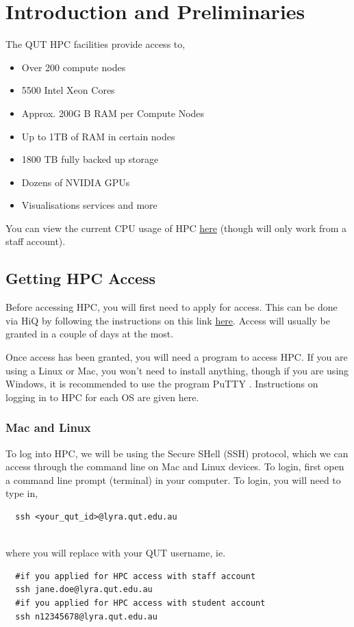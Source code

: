 \section{Introduction and Preliminaries}
%
%
%
%
The QUT HPC facilities provide access to,
\begin{itemize}
\item Over 200 compute nodes
\item 5500 Intel Xeon Cores
\item Approx. 200G B RAM per Compute Nodes
\item Up to 1TB of RAM in certain nodes
\item 1800 TB  fully backed up storage
\item Dozens of NVIDIA GPUs
\item Visualisations services and more
\end{itemize}
%
%
You can view the current CPU usage of HPC \href{https://qutvirtual4.qut.edu.au/group/staff/technology-and-facilities/technology-services/hpc/performance-statistics}{here} (though will only work from a staff account).
%
%
\subsection{Getting HPC Access}
Before accessing HPC, you will first need to apply for access. This can be done via HiQ by following the instructions on this link \href{https://qutvirtual4.qut.edu.au/group/research-students/doing-your-research/specialty-research-facilities/apply-for-a-high-performance-compute-hpc-account}{here}. Access will usually be granted in a couple of days at the most.
%
%
\par
%
%
Once access has been granted, you will need a program to access HPC. If you are using a Linux or Mac, you won't need to install anything, though if you are using Windows, it is recommended to use the program PuTTY \cite{putty}. Instructions on logging in to HPC for each OS are given here.
%
%
\subsubsection{Mac and Linux}
To log into HPC, we will be using the Secure SHell (SSH) protocol, which we can access through the command line on Mac and Linux devices. To login, first open a command line prompt (terminal) in your computer. To login, you will need to type in,
\\
\par
\begin{verbatim}
  ssh <your_qut_id>@lyra.qut.edu.au
\end{verbatim}
\\
where you will replace  with your QUT username, ie.
\\
\par
\begin{verbatim}
  #if you applied for HPC access with staff account
  ssh jane.doe@lyra.qut.edu.au
  #if you applied for HPC access with student account
  ssh n12345678@lyra.qut.edu.au
\end{verbatim}
%
%
%
%
